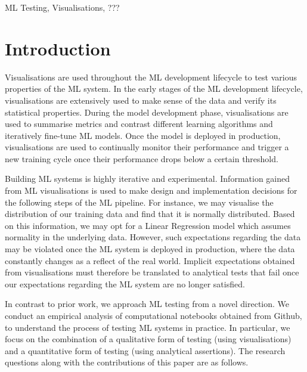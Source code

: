 \documentclass[conference]{IEEEtran}
\begin{document}
\begin{IEEEkeywords}
  ML Testing, Visualisations, ???
\end{IEEEkeywords}

\section{Introduction}\label{sec:intro}

Visualisations are used throughout the ML development lifecycle to test various properties of the ML system. In the early stages of the ML development lifecycle, visualisations are extensively used to make sense of the data and verify its statistical properties. During the model development phase, visualisations are used to summarise metrics and contrast different learning algorithms and iteratively fine-tune ML models. Once the model is deployed in production, visualisations are used to continually monitor their performance and trigger a new training cycle once their performance drops below a certain threshold.

Building ML systems is highly iterative and experimental. Information gained from ML visualisations is used to make design and implementation decisions for the following steps of the ML pipeline. For instance, we may visualise the distribution of our training data and find that it is normally distributed. Based on this information, we may opt for a Linear Regression model which assumes normality in the underlying data. However, such expectations regarding the data may be violated once the ML system is deployed in production, where the data constantly changes as a reflect of the real world. Implicit expectations obtained from visualisations must therefore be translated to analytical tests that fail once our expectations regarding the ML system are no longer satisfied.

In contrast to prior work, we approach ML testing from a novel direction. We conduct an empirical analysis of computational notebooks obtained from Github, to understand the process of testing ML systems in practice. In particular, we focus on the combination of a qualitative form of testing (using visualisations) and a quantitative form of testing (using analytical assertions). The research questions along with the contributions of this paper are as follows.
\end{document}
